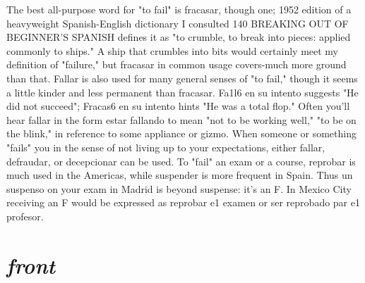 The best all-purpose word for "to fail" is fracasar, though one;
1952 edition of a heavyweight Spanish-English dictionary I consulted
140 BREAKING OUT OF BEGINNER'S SPANISH
defines it as "to crumble, to break into pieces: applied commonly to
ships." A ship that crumbles into bits would certainly meet my definition of "failure," but fracasar in common usage covers-much more
ground than that. Fallar is also used for many general senses of "to
fail," though it seems a little kinder and less permanent than fracasar.
Fa1l6 en su intento suggests "He did not succeed"; Fracas6 en su intento hints "He was a total flop." Often you'll hear fallar in the form
estar fallando to mean "not to be working well," "to be on the blink,"
in reference to some appliance or gizmo. When someone or something
"fails" you in the sense of not living up to your expectations, either
fallar, defraudar, or decepcionar can be used. To "fail" an exam or a
course, reprobar is much used in the Americas, while suspender is
more frequent in Spain. Thus un suspenso on your exam in Madrid is
beyond suspense: it's an F. In Mexico City receiving an F would be expressed as reprobar e1 examen or ser reprobado par e1 profesor.

\section{\emph{front}}

